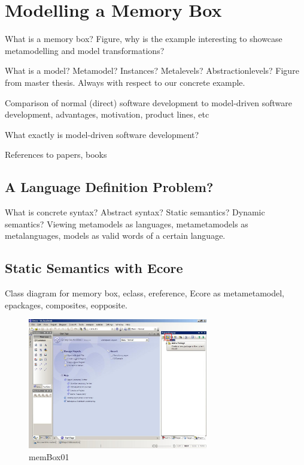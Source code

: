 \chapter{Modelling a Memory Box}
\label{chap:membox}

What is a memory box?  Figure, why is the example interesting to showcase
metamodelling and model transformations?

What is a model? Metamodel? Instances? Metalevels? Abstractionlevels? Figure
from master thesis.  Always with respect to our concrete example.

Comparison of normal (direct) software development to model-driven software
development, advantages, motivation, product lines, etc

What exactly is model-driven software development?

References to papers, books

\section{A Language Definition Problem?}

What is concrete syntax?  Abstract syntax?  Static semantics?  Dynamic
semantics?  Viewing metamodels as languages, metametamodels as metalanguages,
models as valid words of a certain language.

\section{Static Semantics with Ecore}

Class diagram for memory box, eclass, ereference, Ecore as metametamodel,
epackages, composites, eopposite.

\begin{figure}[!h]
	\centering
  \includegraphics[width=0.7\textwidth]{pics/memBox01.png}
	\caption{memBox01}
	\label{memBox01}
\end{figure}

